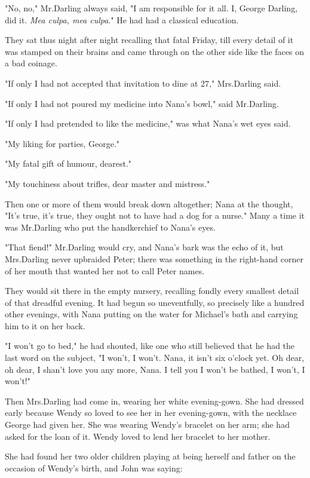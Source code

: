 "No, no," Mr.\@ Darling always said, "I am responsible for it all.
I, George Darling, did it.
\emph{Mea culpa, mea culpa}."
He had had a classical education.

They sat thus night after night recalling that fatal Friday, till every detail of it was stamped on their brains and came through on the other side like the faces on a bad coinage.

"If only I had not accepted that invitation to dine at 27," Mrs.\@ Darling said.

"If only I had not poured my medicine into Nana's bowl," said Mr.\@ Darling.

"If only I had pretended to like the medicine," was what Nana's wet eyes said.

"My liking for parties, George."

"My fatal gift of humour, dearest."

"My touchiness about trifles, dear master and mistress."

Then one or more of them would break down altogether;
Nana at the thought, "It's true, it's true, they ought not to have had a dog for a nurse."
Many a time it was Mr.\@ Darling who put the handkerchief to Nana's eyes.

"That fiend!\@" Mr.\@ Darling would cry, and Nana's bark was the echo of it, but Mrs.\@ Darling never upbraided Peter;
there was something in the right-hand corner of her mouth that wanted her not to call Peter names.

They would sit there in the empty nursery, recalling fondly every smallest detail of that dreadful evening.
It had begun so uneventfully, so precisely like a hundred other evenings, with Nana putting on the water for Michael's bath and carrying him to it on her back.

"I won't go to bed," he had shouted, like one who still believed that he had the last word on the subject, "I won't, I won't.
Nana, it isn't six o'clock yet.
Oh dear, oh dear, I shan't love you any more, Nana.
I tell you I won't be bathed, I won't, I won't!"

Then Mrs.\@ Darling had come in, wearing her white evening-gown.
She had dressed early because Wendy so loved to see her in her evening-gown, with the necklace George had given her.
She was wearing Wendy's bracelet on her arm;
she had asked for the loan of it.
Wendy loved to lend her bracelet to her mother.

She had found her two older children playing at being herself and father on the occasion of Wendy's birth, and John was saying:

